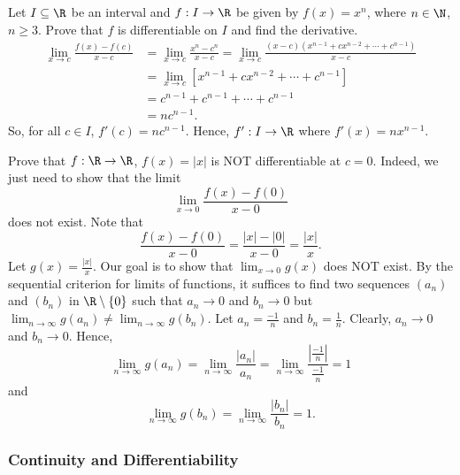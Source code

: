 \begin{eg}
    Let \( I \subseteq  \R  \) be an interval and \( f: I \to \R  \) be given by \( f(x) = x^{n} \), where \( n \in \N  \), \( n \geq 3  \). Prove that \( f  \) is differentiable on \( I  \) and find the derivative.   
    \begin{align*}
        \lim_{ x \to c  }  \frac{ f(x) - f(c) }{ x - c  }  &= \lim_{ x \to c  }  \frac{ x^{n} - c^{n}  }{  x - c  }  = \lim_{ x \to c  }  \frac{ (x - c ) (x^{n-1} + c x^{n-2 } + \cdots + c^{n-1}) }{  x  -c  }  \\
                                                           &= \lim_{ x \to c  }  [x^{n-1} + c x^{n-2 } + \cdots  + c^{n-1} ] \\
                                                           &= c^{n-1 } + c^{n-1} + \cdots + c^{n-1} \\
                                                           &= n c^{n-1}.
    \end{align*}
    So, for all \( c \in I  \), \( f'(c) = n c^{n-1} \). Hence, \( f': I \to \R  \) where \( f'(x) = n x^{n-1 } \).
\end{eg}

\begin{eg}
Prove that \( f: \R \to \R  \), \( f(x) = | x  |  \) is NOT differentiable at \( c = 0  \). Indeed, we just need to show that the limit
\[  \lim_{ x \to 0  }  \frac{ f(x) - f(0) }{ x - 0  }   \]
does not exist. Note that 
\[  \frac{ f(x) - f(0) }{ x - 0 }  = \frac{ | x  |  - | 0  |  }{ x - 0  } = \frac{ | x  |  }{ x  }. \]
Let \( g(x) = \frac{ | x  |  }{ x  }  \). Our goal is to show that \( \lim_{ x \to 0  } g(x) \) does NOT exist. By the sequential criterion for limits of functions, it suffices to find two sequences \( ({a}_{n}) \) and \( ({b}_{n}) \) in \( \R \setminus  \{  0  \}  \) such that \( {a}_{n} \to 0  \) and \( {b}_{n} \to 0  \) but \( \lim_{ n \to \infty  }  g({a}_{n}) \neq \lim_{ n \to \infty  }  g({b}_{n}) \). Let \( {a}_{n}= \frac{ -1  }{ n }  \) and \( {b}_{n} = \frac{ 1 }{ n }  \). Clearly, \( {a}_{n} \to 0  \) and \( {b}_{n} \to 0  \). Hence, 
\[  \lim_{ n \to \infty  }  g({a}_{n}) = \lim_{ n \to \infty  }  \frac{ | {a}_{n} |  }{ {a}_{n} }  = \lim_{ n \to \infty  }  \frac{ | \frac{ -1 }{ n }  |  }{ \frac{ -1 }{ n }  } = 1  \]
and
\[  \lim_{ n \to \infty  }  g({b}_{n}) = \lim_{ n \to \infty  }  \frac{ | {b}_{n} |   }{ {b}_{n}  } = 1.  \]
\end{eg}

\subsubsection{Continuity and Differentiability}\label{Continuity and Differentiability}


